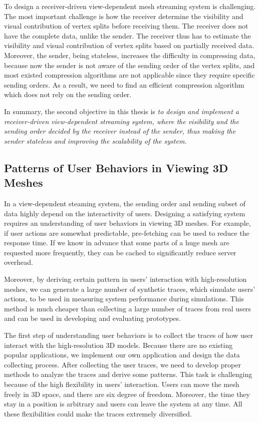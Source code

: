     To design a receiver-driven view-dependent mesh streaming
    system is challenging. The most important
    challenge is how the receiver determine the visibility and visual contribution
    of vertex splits before receiving them. The receiver does not have
    the complete data, unlike the sender. The receiver thus has to estimate
    the visibility and visual contribution of vertex splits based on 
    partially received data. Moreover, the sender, being stateless, increases
    the difficulty in compressing data, because now the sender is not aware
    of the sending order of the vertex splits, and most existed compression algorithms
    are not applicable since they require specific sending orders.
    As a result, we need to find an efficient 
    compression algorithm which does not rely on the sending order.

    In summary, the second objective in this thesis is 
            \textit{to design and implement
            a receiver-driven view-dependent streaming system, where
            the visibility and the sending order decided by the receiver instead of the sender,
            thus making the sender stateless and improving the scalability of the system.}

    \subsection{Patterns of User Behaviors in Viewing 3D Meshes}
    In a view-dependent steaming system, the sending order and sending subset 
    of data highly depend on the interactivity of users. 
    Designing a satisfying system
    requires an understanding of user behaviors in viewing 3D meshes.
    For example, if user actions are somewhat predictable, pre-fetching can 
    be used to reduce the response time. If we know in advance that some parts
    of a huge mesh are requested more frequently, they can be 
    cached to significantly reduce server overhead.

    Moreover, by deriving certain pattern in users' interaction with
    high-resolution meshes, we can generate a large number of synthetic traces,
    which simulate users' actions, to be used in measuring system
    performance during simulations. This method is much cheaper than collecting 
    a large number of traces from real users and can be used in developing and evaluating
    prototypes. 

    The first step of understanding user behaviors is to collect the traces of 
    how user interact with the high-resolution 3D models. Because there are no
    existing popular applications, we implement our own application and
    design the data collecting process.
    After collecting the user traces, we need to develop proper methods to analyze
    the traces and derive some patterns. This task is challenging because of the high
    flexibility in users' interaction. Users can move the mesh freely in 3D space, and
    there are six degree of freedom. Moreover, the time they stay in a position is arbitrary
    and users can leave the system at any time. All these flexibilities could make the traces
    extremely diversified.
    
